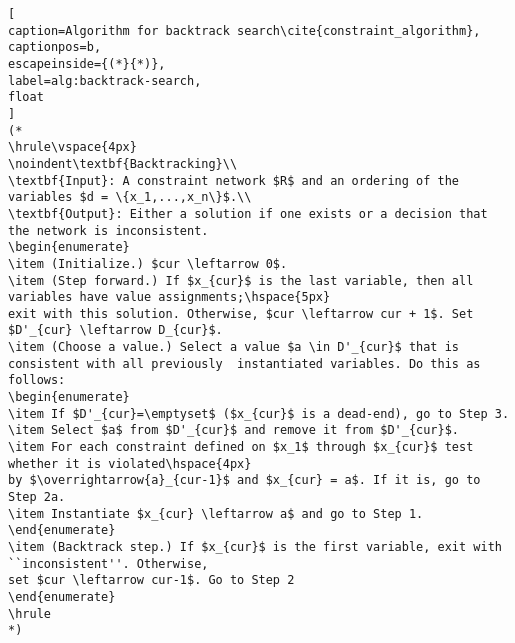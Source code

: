\begin{lstlisting}[
caption=Algorithm for backtrack search\cite{constraint_algorithm}, 
captionpos=b, 
escapeinside={(*}{*)}, 
label=alg:backtrack-search,
float
]
(*
\hrule\vspace{4px}
\noindent\textbf{Backtracking}\\
\textbf{Input}: A constraint network $R$ and an ordering of the variables $d = \{x_1,...,x_n\}$.\\
\textbf{Output}: Either a solution if one exists or a decision that the network is inconsistent.
\begin{enumerate}
\item (Initialize.) $cur \leftarrow 0$.
\item (Step forward.) If $x_{cur}$ is the last variable, then all variables have value assignments;\hspace{5px}
exit with this solution. Otherwise, $cur \leftarrow cur + 1$. Set $D'_{cur} \leftarrow D_{cur}$.
\item (Choose a value.) Select a value $a \in D'_{cur}$ that is consistent with all previously  instantiated variables. Do this as follows:
\begin{enumerate} 
\item If $D'_{cur}=\emptyset$ ($x_{cur}$ is a dead-end), go to Step 3.
\item Select $a$ from $D'_{cur}$ and remove it from $D'_{cur}$.
\item For each constraint defined on $x_1$ through $x_{cur}$ test whether it is violated\hspace{4px}
by $\overrightarrow{a}_{cur-1}$ and $x_{cur} = a$. If it is, go to Step 2a.
\item Instantiate $x_{cur} \leftarrow a$ and go to Step 1.
\end{enumerate}
\item (Backtrack step.) If $x_{cur}$ is the first variable, exit with ``inconsistent''. Otherwise,
set $cur \leftarrow cur-1$. Go to Step 2
\end{enumerate}
\hrule
*)
\end{lstlisting}